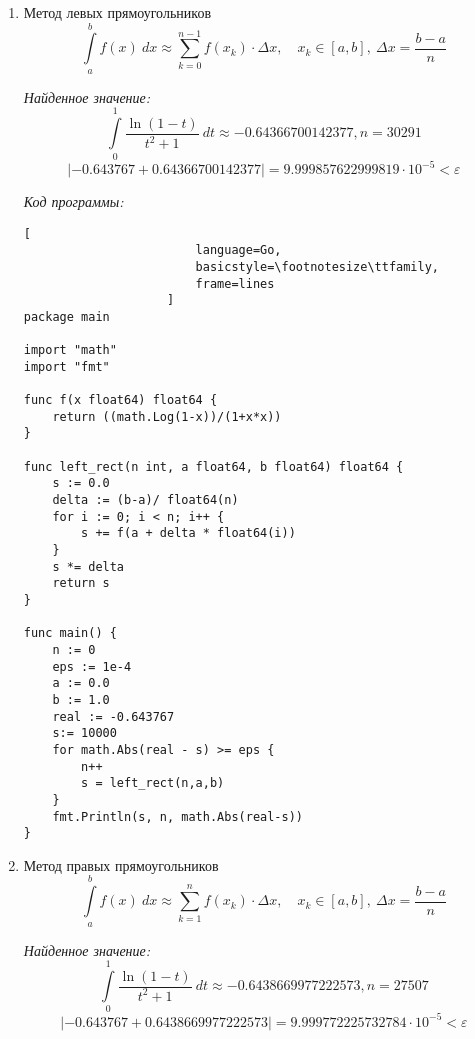 \documentclass[14pt, a4paper, titlepage, fleqn]{extarticle}
\begin{document}
            \begin{enumerate}
                \item Метод левых прямоугольников
                    \[
                        \int\limits_a^b f(x) ~ dx \approx
                        \sum_{k=0}^{n-1} f\left( x_k \right) \cdot \Delta x,
                        \quad x_k \in [a, b], ~ \Delta x = \frac{b-a}{n}    
                    \]

                    \textit{Найденное значение:}
                    \[
                        \int\limits_0^1 \frac{\ln(1-t)}{t^2+1} ~ dt \approx
                        -0.64366700142377, n = 30291
                    \]
                    \[
                        |-0.643767+0.64366700142377| = 9.999857622999819 
                        \cdot 10^{-5} < \varepsilon
                    \]

                    \textit{Код программы:}
                    \begin{lstlisting}[
                        language=Go,
                        basicstyle=\footnotesize\ttfamily,
                        frame=lines
                    ]
package main

import "math"
import "fmt"

func f(x float64) float64 {
    return ((math.Log(1-x))/(1+x*x))
}

func left_rect(n int, a float64, b float64) float64 {
    s := 0.0
    delta := (b-a)/ float64(n)
    for i := 0; i < n; i++ {
        s += f(a + delta * float64(i))
    }
    s *= delta
    return s
}

func main() {
    n := 0
    eps := 1e-4
    a := 0.0
    b := 1.0
    real := -0.643767
    s:= 10000
    for math.Abs(real - s) >= eps {
        n++
        s = left_rect(n,a,b)
    }
    fmt.Println(s, n, math.Abs(real-s))
}
                    \end{lstlisting}


                \item Метод правых прямоугольников
                \[
                    \int\limits_a^b f(x) ~ dx \approx
                    \sum_{k=1}^{n} f\left( x_k \right) \cdot \Delta x,
                    \quad x_k \in [a, b], ~ \Delta x = \frac{b-a}{n}    
                \]

                \textit{Найденное значение:}
                \[
                    \int\limits_0^1 \frac{\ln(1-t)}{t^2+1} ~ dt \approx
                    -0.6438669977222573, n = 27507
                \]
                \[
                    |-0.643767+0.6438669977222573| = 9.999772225732784 
                    \cdot 10^{-5} < \varepsilon
                \]


\end{enumerate}
\end{document}
